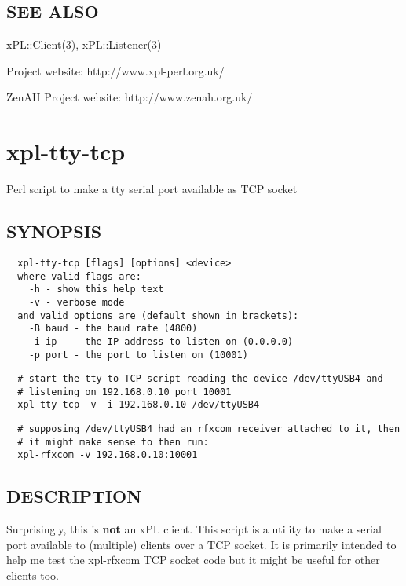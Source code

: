 \subsection*{SEE ALSO\label{xpl-sql-logger_SEE_ALSO}}


xPL::Client(3), xPL::Listener(3)



Project website: http://www.xpl-perl.org.uk/



ZenAH Project website: http://www.zenah.org.uk/

\section{xpl-tty-tcp\label{xpl-tty-tcp}}


Perl script to make a tty serial port available as TCP socket

\subsection*{SYNOPSIS\label{xpl-tty-tcp_SYNOPSIS}}
\begin{verbatim}
  xpl-tty-tcp [flags] [options] <device>
  where valid flags are:
    -h - show this help text
    -v - verbose mode
  and valid options are (default shown in brackets):
    -B baud - the baud rate (4800)
    -i ip   - the IP address to listen on (0.0.0.0)
    -p port - the port to listen on (10001)
\end{verbatim}
\begin{verbatim}
  # start the tty to TCP script reading the device /dev/ttyUSB4 and
  # listening on 192.168.0.10 port 10001
  xpl-tty-tcp -v -i 192.168.0.10 /dev/ttyUSB4
\end{verbatim}
\begin{verbatim}
  # supposing /dev/ttyUSB4 had an rfxcom receiver attached to it, then
  # it might make sense to then run:
  xpl-rfxcom -v 192.168.0.10:10001
\end{verbatim}
\subsection*{DESCRIPTION\label{xpl-tty-tcp_DESCRIPTION}}


Surprisingly, this is \textbf{not} an xPL client.  This script is a utility
to make a serial port available to (multiple) clients over a TCP
socket.  It is primarily intended to help me test the xpl-rfxcom TCP
socket code but it might be useful for other clients too.

